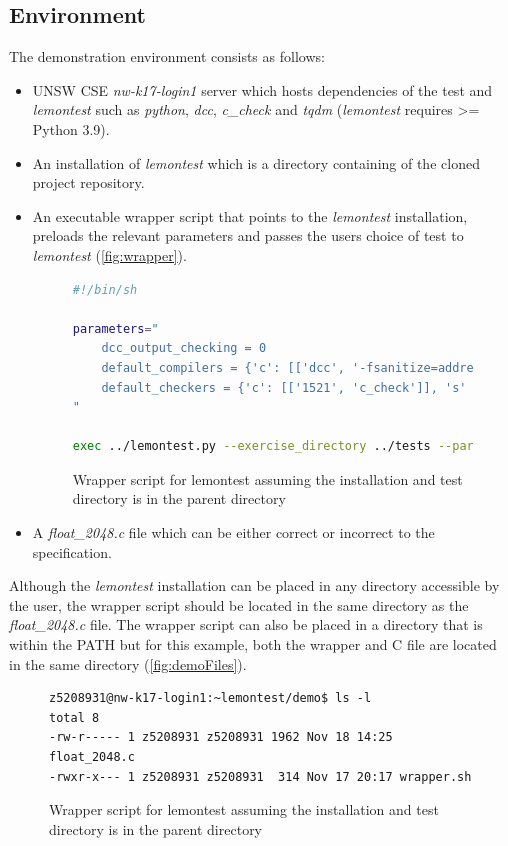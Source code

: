 \documentclass[hidelinks]{report}
\begin{document}
\subsection{Environment}
The demonstration environment consists as follows:
\begin{itemize}
	\item UNSW CSE \textit{nw-k17-login1} server which hosts dependencies of the test and \textit{lemontest} such as \textit{python}, \textit{dcc}, \textit{c\_check} and \textit{tqdm} (\textit{lemontest} requires >= Python 3.9).
	\item An installation of \textit{lemontest} which is a directory containing of the cloned project repository.
	\item An executable wrapper script that points to the \textit{lemontest} installation, preloads the relevant parameters and passes the users choice of test to \textit{lemontest} (\autoref{fig:wrapper}).
	\begin{figure}[h]
		\centering
		\begin{lstlisting}[language=bash, breaklines=true, linewidth=\linewidth, tabsize=4]
#!/bin/sh

parameters="
	dcc_output_checking = 0
	default_compilers = {'c': [['dcc', '-fsanitize=address'], ['dcc', '-fsanitize=valgrind']]}
	default_checkers = {'c': [['1521', 'c_check']], 's' : [['1521', 'mipsy', '--check']]}
"

exec ../lemontest.py --exercise_directory ../tests --parameters "$parameters" "$@"
		\end{lstlisting}
		\caption{Wrapper script for lemontest assuming the installation and test directory is in the parent directory}
		\label{fig:wrapper}
	\end{figure}
	\item A \textit{float\_2048.c} file which can be either correct or incorrect to the specification.
\end{itemize}
Although the \textit{lemontest} installation can be placed in any directory accessible by the user, the wrapper script should be located in the same directory as the \textit{float\_2048.c} file. The wrapper script can also be placed in a directory that is within the PATH but for this example, both the wrapper and C file are located in the same directory (\autoref{fig:demoFiles}).
\begin{figure}[h]
	\centering
	\begin{lstlisting}[breaklines=true, linewidth=\linewidth, tabsize=4]
z5208931@nw-k17-login1:~lemontest/demo$ ls -l
total 8
-rw-r----- 1 z5208931 z5208931 1962 Nov 18 14:25 float_2048.c
-rwxr-x--- 1 z5208931 z5208931  314 Nov 17 20:17 wrapper.sh
	\end{lstlisting}
	\caption{Wrapper script for lemontest assuming the installation and test directory is in the parent directory}
	\label{fig:demoFiles}
\end{figure}
\end{document}
